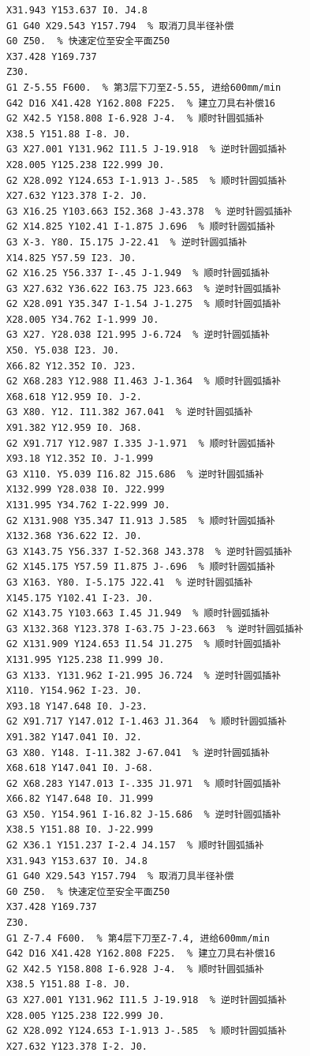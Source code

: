 \documentclass{xautCADreport}
\begin{document}
\begin{lstlisting}[language={}, title={工序50-凸模.nc（完整程序）}, basicstyle=\ttfamily\tiny]
X31.943 Y153.637 I0. J4.8
G1 G40 X29.543 Y157.794  % 取消刀具半径补偿
G0 Z50.  % 快速定位至安全平面Z50
X37.428 Y169.737
Z30.
G1 Z-5.55 F600.  % 第3层下刀至Z-5.55, 进给600mm/min
G42 D16 X41.428 Y162.808 F225.  % 建立刀具右补偿16
G2 X42.5 Y158.808 I-6.928 J-4.  % 顺时针圆弧插补
X38.5 Y151.88 I-8. J0.
G3 X27.001 Y131.962 I11.5 J-19.918  % 逆时针圆弧插补
X28.005 Y125.238 I22.999 J0.
G2 X28.092 Y124.653 I-1.913 J-.585  % 顺时针圆弧插补
X27.632 Y123.378 I-2. J0.
G3 X16.25 Y103.663 I52.368 J-43.378  % 逆时针圆弧插补
G2 X14.825 Y102.41 I-1.875 J.696  % 顺时针圆弧插补
G3 X-3. Y80. I5.175 J-22.41  % 逆时针圆弧插补
X14.825 Y57.59 I23. J0.
G2 X16.25 Y56.337 I-.45 J-1.949  % 顺时针圆弧插补
G3 X27.632 Y36.622 I63.75 J23.663  % 逆时针圆弧插补
G2 X28.091 Y35.347 I-1.54 J-1.275  % 顺时针圆弧插补
X28.005 Y34.762 I-1.999 J0.
G3 X27. Y28.038 I21.995 J-6.724  % 逆时针圆弧插补
X50. Y5.038 I23. J0.
X66.82 Y12.352 I0. J23.
G2 X68.283 Y12.988 I1.463 J-1.364  % 顺时针圆弧插补
X68.618 Y12.959 I0. J-2.
G3 X80. Y12. I11.382 J67.041  % 逆时针圆弧插补
X91.382 Y12.959 I0. J68.
G2 X91.717 Y12.987 I.335 J-1.971  % 顺时针圆弧插补
X93.18 Y12.352 I0. J-1.999
G3 X110. Y5.039 I16.82 J15.686  % 逆时针圆弧插补
X132.999 Y28.038 I0. J22.999
X131.995 Y34.762 I-22.999 J0.
G2 X131.908 Y35.347 I1.913 J.585  % 顺时针圆弧插补
X132.368 Y36.622 I2. J0.
G3 X143.75 Y56.337 I-52.368 J43.378  % 逆时针圆弧插补
G2 X145.175 Y57.59 I1.875 J-.696  % 顺时针圆弧插补
G3 X163. Y80. I-5.175 J22.41  % 逆时针圆弧插补
X145.175 Y102.41 I-23. J0.
G2 X143.75 Y103.663 I.45 J1.949  % 顺时针圆弧插补
G3 X132.368 Y123.378 I-63.75 J-23.663  % 逆时针圆弧插补
G2 X131.909 Y124.653 I1.54 J1.275  % 顺时针圆弧插补
X131.995 Y125.238 I1.999 J0.
G3 X133. Y131.962 I-21.995 J6.724  % 逆时针圆弧插补
X110. Y154.962 I-23. J0.
X93.18 Y147.648 I0. J-23.
G2 X91.717 Y147.012 I-1.463 J1.364  % 顺时针圆弧插补
X91.382 Y147.041 I0. J2.
G3 X80. Y148. I-11.382 J-67.041  % 逆时针圆弧插补
X68.618 Y147.041 I0. J-68.
G2 X68.283 Y147.013 I-.335 J1.971  % 顺时针圆弧插补
X66.82 Y147.648 I0. J1.999
G3 X50. Y154.961 I-16.82 J-15.686  % 逆时针圆弧插补
X38.5 Y151.88 I0. J-22.999
G2 X36.1 Y151.237 I-2.4 J4.157  % 顺时针圆弧插补
X31.943 Y153.637 I0. J4.8
G1 G40 X29.543 Y157.794  % 取消刀具半径补偿
G0 Z50.  % 快速定位至安全平面Z50
X37.428 Y169.737
Z30.
G1 Z-7.4 F600.  % 第4层下刀至Z-7.4, 进给600mm/min
G42 D16 X41.428 Y162.808 F225.  % 建立刀具右补偿16
G2 X42.5 Y158.808 I-6.928 J-4.  % 顺时针圆弧插补
X38.5 Y151.88 I-8. J0.
G3 X27.001 Y131.962 I11.5 J-19.918  % 逆时针圆弧插补
X28.005 Y125.238 I22.999 J0.
G2 X28.092 Y124.653 I-1.913 J-.585  % 顺时针圆弧插补
X27.632 Y123.378 I-2. J0.

\end{lstlisting}
\end{document}

